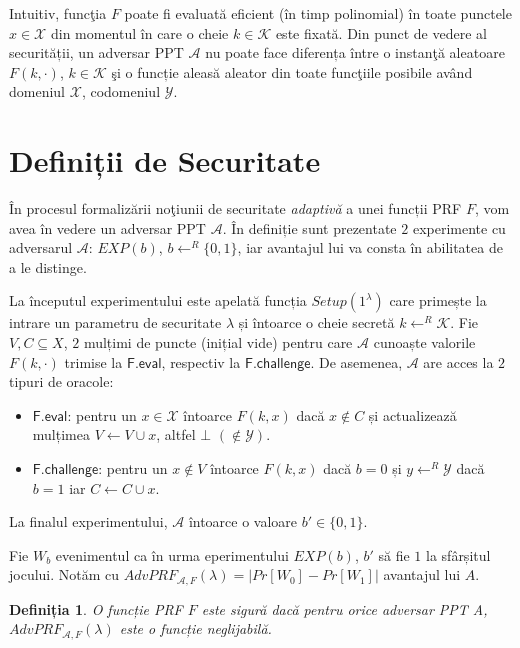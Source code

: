 \documentclass[oneside, 12pt]{book}
\newtheorem{definitie}{\textbf{Definiția}}[section]
\begin{document}
Intuitiv, funcţia $F$ poate fi evaluată eficient (în timp polinomial) în toate punctele $x \in \mathcal{X}$ din momentul în care o cheie $k \in \mathcal{K}$ este fixată. 
Din punct de vedere al securității, un adversar PPT $\mathcal{A}$ nu poate face diferența între o instanţă aleatoare $F(k, \cdot)$, $k \in \mathcal{K}$ şi o funcție aleasă aleator din toate funcţiile posibile având domeniul $\mathcal{X}$, codomeniul $\mathcal{Y}$.


\section{Definiții de Securitate}
\label{subsec:prf-security}

În procesul formalizării noţiunii de securitate \textit{adaptivă} a unei funcții PRF $F$, vom avea în vedere un adversar PPT $\mathcal{A}$. În definiție sunt prezentate $2$ experimente cu adversarul $\mathcal{A}$: $EXP(b)$, $b \leftarrow ^ R \{0,1\}$, iar avantajul lui va consta în abilitatea de a le distinge. 

La începutul experimentului este apelată funcția $Setup(1^\lambda)$ care primește la intrare un parametru de securitate $\lambda$ și întoarce o cheie secretă $k \leftarrow^R \mathcal{K}$. Fie $V, C \subseteq X$, $2$ mulțimi de puncte (inițial vide) pentru care $\mathcal{A}$ cunoaște valorile $F(k, \cdot)$ trimise la $\mathsf{F.eval}$, respectiv la $\mathsf{F.challenge}$. De asemenea, $\mathcal{A}$ are acces la $2$ tipuri de oracole:
\begin{itemize}
	\item $\mathsf{F.eval}$: pentru un $x \in \mathcal{X}$ întoarce $F(k, x)$ dacă $x \not \in C$ și actualizează mulțimea $V \leftarrow V \cup x$, altfel $\bot$ $(\not \in \mathcal{Y})$.
	\item $\mathsf{F.challenge}$: pentru un $x \not \in V$ întoarce $F(k, x)$ dacă $b = 0$ și $y \leftarrow^R \mathcal{Y}$ dacă $b = 1$ iar $C \leftarrow C \cup x$. 
\end{itemize}
La finalul experimentului, $\mathcal{A}$ întoarce o valoare $b' \in \{0, 1\}$.

Fie $W_b$ evenimentul ca în urma eperimentului $EXP(b)$, $b'$ să fie $1$ la sfârșitul jocului. Notăm cu $AdvPRF_{\mathcal{A},F}(\lambda) = |Pr[W_0] - Pr[W_1]|$ avantajul lui $A$.
\\
\begin{definitie}
	O funcție PRF $F$ este sigură dacă pentru orice adversar PPT A, $AdvPRF_{\mathcal{A},F}(\lambda)$ este o funcție neglijabilă.
\end{definitie}
\end{document}
